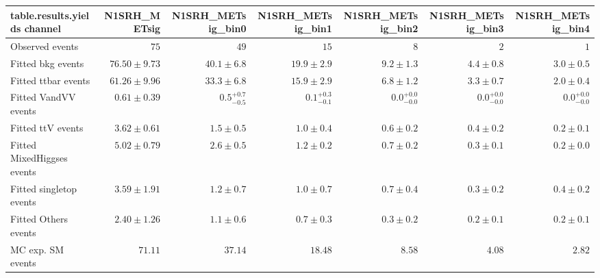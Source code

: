 

\begin{table}
\centering
\small
\begin{tabular*}{\textwidth}{@{\extracolsep{\fill}}lrrrrrr}
\toprule
\textbf{table.results.yields channel}           & N1SRH\_METsig            & N1SRH\_METsig\_bin0            & N1SRH\_METsig\_bin1            & N1SRH\_METsig\_bin2            & N1SRH\_METsig\_bin3            & N1SRH\_METsig\_bin4              \\
\midrule
Observed events          & $75$              & $49$              & $15$              & $8$              & $2$              & $1$                    \\
\midrule
Fitted bkg events         & $76.50 \pm 9.73$          & $40.1 \pm 6.8$          & $19.9 \pm 2.9$          & $9.2 \pm 1.3$          & $4.4 \pm 0.8$          & $3.0 \pm 0.5$              \\
\midrule
        Fitted ttbar events         & $61.26 \pm 9.96$          & $33.3 \pm 6.8$          & $15.9 \pm 2.9$          & $6.8 \pm 1.2$          & $3.3 \pm 0.7$          & $2.0 \pm 0.4$              \\
        Fitted VandVV events         & $0.61 \pm 0.39$          & $0.5_{-0.5}^{+0.7}$          & $0.1_{-0.1}^{+0.3}$          & $0.0_{-0.0}^{+0.0}$          & $0.0_{-0.0}^{+0.0}$          & $0.0_{-0.0}^{+0.0}$              \\
        Fitted ttV events         & $3.62 \pm 0.61$          & $1.5 \pm 0.5$          & $1.0 \pm 0.4$          & $0.6 \pm 0.2$          & $0.4 \pm 0.2$          & $0.2 \pm 0.1$              \\
        Fitted MixedHiggses events         & $5.02 \pm 0.79$          & $2.6 \pm 0.5$          & $1.2 \pm 0.2$          & $0.7 \pm 0.2$          & $0.3 \pm 0.1$          & $0.2 \pm 0.0$              \\
        Fitted singletop events         & $3.59 \pm 1.91$          & $1.2 \pm 0.7$          & $1.0 \pm 0.7$          & $0.7 \pm 0.4$          & $0.3 \pm 0.2$          & $0.4 \pm 0.2$              \\
        Fitted Others events         & $2.40 \pm 1.26$          & $1.1 \pm 0.6$          & $0.7 \pm 0.3$          & $0.3 \pm 0.2$          & $0.2 \pm 0.1$          & $0.2 \pm 0.1$              \\
 \midrule
MC exp. SM events              & $71.11$          & $37.14$          & $18.48$          & $8.58$          & $4.08$          & $2.82$              \\

\end{tabular*}
\end{table}
